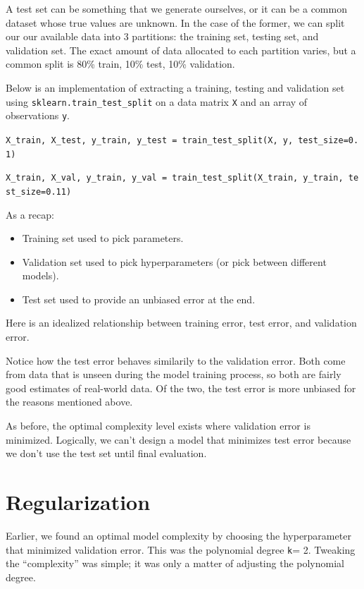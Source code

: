 \documentclass[
  letterpaper,
  DIV=11,
  numbers=noendperiod]{scrreprt}
\providecommand{\tightlist}{%
  \setlength{\itemsep}{0pt}\setlength{\parskip}{0pt}}\usepackage{longtable,booktabs,array}
\begin{document}
A test set can be something that we generate ourselves, or it can be a
common dataset whose true values are unknown. In the case of the former,
we can split our our available data into 3 partitions: the training set,
testing set, and validation set. The exact amount of data allocated to
each partition varies, but a common split is 80\% train, 10\% test, 10\%
validation.

Below is an implementation of extracting a training, testing and
validation set using \texttt{sklearn.train\_test\_split} on a data
matrix \texttt{X} and an array of observations \texttt{y}.

\texttt{X\_train,\ X\_test,\ y\_train,\ y\_test\ =\ train\_test\_split(X,\ y,\ test\_size=0.1)}

\texttt{X\_train,\ X\_val,\ y\_train,\ y\_val\ =\ train\_test\_split(X\_train,\ y\_train,\ test\_size=0.11)}

As a recap:

\begin{itemize}
\tightlist
\item
  Training set used to pick parameters.
\item
  Validation set used to pick hyperparameters (or pick between different
  models).
\item
  Test set used to provide an unbiased error at the end.
\end{itemize}

Here is an idealized relationship between training error, test error,
and validation error.

Notice how the test error behaves similarily to the validation error.
Both come from data that is unseen during the model training process, so
both are fairly good estimates of real-world data. Of the two, the test
error is more unbiased for the reasons mentioned above.

As before, the optimal complexity level exists where validation error is
minimized. Logically, we can't design a model that minimizes test error
because we don't use the test set until final evaluation.

\hypertarget{regularization}{%
\section{Regularization}\label{regularization}}

Earlier, we found an optimal model complexity by choosing the
hyperparameter that minimized validation error. This was the polynomial
degree \texttt{k}= 2. Tweaking the ``complexity'' was simple; it was
only a matter of adjusting the polynomial degree.
\end{document}
